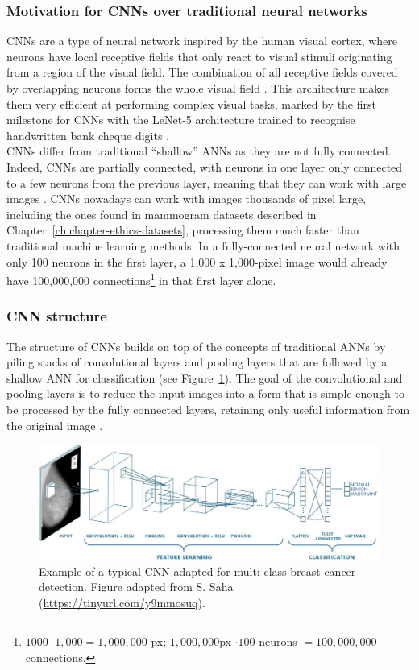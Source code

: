 \subsubsection{Motivation for CNNs over traditional neural networks}

CNNs are a type of neural network inspired by the human visual cortex, where neurons have local receptive fields that only react to visual stimuli originating from a region of the visual field. The combination of all receptive fields covered by overlapping neurons forms the whole visual field \citep{Li2008}. This architecture makes them very efficient at performing complex visual tasks, marked by the first milestone for CNNs with the LeNet-5 architecture trained to recognise handwritten bank cheque digits \citep{LeCun1998}.\\

CNNs differ from traditional ``shallow'' ANNs as they are not fully connected. Indeed, CNNs are partially connected, with neurons in one layer only connected to a few neurons from the previous layer, meaning that they can work with large images \citep{Geron2019}. CNNs nowadays can work with images thousands of pixel large, including the ones found in mammogram datasets described in Chapter~\ref{ch:chapter-ethics-datasets}, processing them much faster than traditional machine learning methods. In a fully-connected neural network with only 100 neurons in the first layer, a 1,000 x 1,000-pixel image would already have 100,000,000 connections\footnote{$1000 \cdot 1,000 = 1,000,000$ px; $1,000,000$px $\cdot 100$ neurons $= 100,000,000$ connections.} in that first layer alone.

\subsubsection{CNN structure}

The structure of CNNs builds on top of the concepts of traditional ANNs by piling stacks of convolutional layers and pooling layers that are followed by a shallow ANN for classification (see Figure~\ref{fig:litsurvey-CNN-example}). The goal of the convolutional and pooling layers is to reduce the input images into a form that is simple enough to be processed by the fully connected layers, retaining only useful information from the original image \citep{Shen2017}.

\begin{figure}[ht]
\centerline{\includegraphics[width=\textwidth]{figures/litsurvey/CNN example.png}}
\caption{\label{fig:litsurvey-CNN-example}Example of a typical CNN adapted for multi-class breast cancer detection. Figure adapted from S. Saha (\url{https://tinyurl.com/y9mmosuq}).}
\end{figure}

